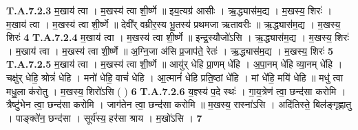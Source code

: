 \documentclass[17pt]{extarticle}
\begin{document}
                                                                  \textbf{ T.A.7.2.3} \newline
                  म॒खाय॑ त्वा । म॒खस्य॑ त्वा शी॒र्ष्णे ॥ इय॒त्यग्र॑ आसीः ।  ऋ॒द्ध्यास॑म॒द्य । म॒खस्य॒ शिरः॑ । म॒खाय॑ त्वा । म॒खस्य॑ त्वा शी॒र्ष्णे ॥ देवी᳚र् वम्रीर॒स्य भू॒तस्य॑ प्रथमजा ऋतावरीः ॥ ऋ॒द्ध्यास॑म॒द्य । म॒खस्य॒ शिरः॑ \textbf{ 4} \newline
                  \newline
                                                                  \textbf{ T.A.7.2.4} \newline
                  म॒खाय॑ त्वा । म॒खस्य॑ त्वा शी॒र्ष्णे ॥ इन्द्र॒स्यौजो॑ऽसि ।  ऋ॒द्ध्यास॑म॒द्य । म॒खस्य॒ शिरः॑ । म॒खाय॑ त्वा । म॒खस्य॑ त्वा शी॒र्ष्णे ॥ अ॒ग्नि॒जा अ॑सि प्र॒जाप॑ते॒ रेतः॑ । ऋ॒द्ध्यास॑म॒द्य । म॒खस्य॒ शिरः॑ \textbf{ 5} \newline
                  \newline
                                                                  \textbf{ T.A.7.2.5} \newline
                  म॒खाय॑ त्वा । म॒खस्य॑ त्वा शी॒र्ष्णे ॥ आयु॑र् धेहि प्रा॒णम् धे॑हि । अ॒पा॒नम् धे॑हि व्या॒नम् धे॑हि । चक्षु॑र् धेहि॒ श्रोत्रं॑ धेहि । मनो॑ धेहि॒ वाचं॑ धेहि । आ॒त्मानं॑ धेहि प्रति॒ष्ठां धे॑हि ।  मां धे॑हि॒ मयि॑ धेहि ॥ मधु॑ त्वा मधु॒ला क॑रोतु ।  म॒खस्य॒ शिरो॑ऽसि ( ) \textbf{ 6} \newline
                  \newline
                                                                  \textbf{ T.A.7.2.6} \newline
                  य॒ज्ञ्स्य॑ प॒दे स्थः॑ । गा॒य॒त्रेण॑ त्वा॒ छन्द॑सा करोमि । त्रैष्टु॑भेन त्वा॒ छन्द॑सा करोमि । जाग॑तेन त्वा॒ छन्द॑सा करोमि ॥ म॒खस्य॒ रास्ना॑ऽसि । अदि॑तिस्ते॒ बिल॑ङ्गृह्णातु । पाङ्क्ते॑न॒ छन्द॑सा ।  सूर्य॑स्य॒ हर॑सा श्राय । म॒खो॑ऽसि । \textbf{ 7} \newline
                  \newline
                                                  
\end{document}
